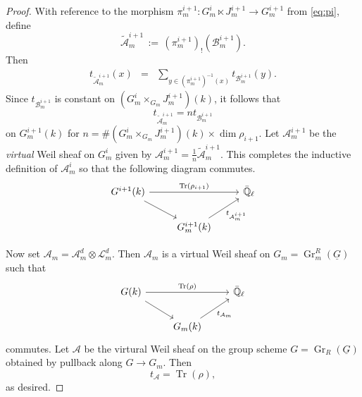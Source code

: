 \documentclass[10pt]{amsart}
\theoremstyle{plain}
\theoremstyle{definition}
\newcommand{\EE}{\mathbb{\bar Q}_\ell}
\newcommand{\Fq}{k}
\DeclareMathOperator{\Gr}{Gr}
\DeclareMathOperator{\trace}{Tr}
\newcommand{\ceq}{{\, :=\, }}
\newcommand{\trFrob}[1]{t_{#1}}
\newcommand{\cs}[1]{{\mathcal{#1}}}
\begin{document}
\begin{proof}
With reference to the morphism $\pi_m^{i+1} : G_m^i \ltimes J_m^{i+1} \to G_m^{i+1}$ from \eqref{eq:pi}, define 
\[
\cs{\tilde A}_m^{i+1} \ceq (\pi_m^{i+1})_! (\cs{B}_m^{i+1}).
\]
Then
\begin{eqnarray*}
\trFrob{\cs{\tilde A}^{i+1}_m}(x)
&=& \sum_{y\in (\pi_m^{i+1})^{-1}(x)}  \trFrob{\cs{B}_m^{i+1}}(y).
\end{eqnarray*}
Since $\trFrob{\cs{B}^{i+1}_m}$ is constant on $(G_m^{i}\times_{G_m} J_m^{i+1})(\Fq)$, it follows that 
\[
\trFrob{\cs{\tilde A}^{i+1}_m} = n \trFrob{\cs{B}^{i+1}_m}
\]
on $G_m^{i+1}(\Fq)$ for $n = \# (G_m^{i}\times_{G_m} J_m^{i+1})(\Fq) \times \dim \rho_{i+1} $.
Let $\cs{A}_m^{i+1}$ be the \emph{virtual} Weil sheaf on $G_m^i$ given by $\cs{A}_m^{i+1} = \frac{1}{n} \cs{\tilde A}_m^{i+1}$. 
%
This completes the inductive definition of $\cs{A}_m^i$ so that the following diagram commutes.
\[
\begin{tikzcd}
G^{i+1}(\Fq) \arrow{rr}{\trace(\rho_{i+1})} \arrow{rd} && \EE\\
& G_m^{i+1}(\Fq)\arrow{ru}[swap]{{\trFrob{\cs{A}_m^{i+1}}} } & 
\end{tikzcd}
\]

Now set $\cs{A}_m = \cs{A}_m^{d} \otimes \cs{L}_m^d$.
Then $\cs{A}_m$ is a virtual Weil sheaf on $G_m = \Gr^{R}_m(\underline{G})$ such that
\[
\begin{tikzcd}
G(\Fq) \arrow{rr}{\trace(\rho)} \arrow{rd} && \EE\\
& G_m(\Fq) \arrow{ru}[swap]{\trFrob{\cs{A}_m}} & 
\end{tikzcd}
\]
commutes.
Let $\cs{A}$ be the virtural Weil sheaf on the group scheme $G= \Gr_{R}(\underline{G})$ obtained by pullback along $G \to G_m$.
Then 
\[
\trFrob{\cs{A}} = \trace(\rho),
\] 
as desired.
\end{proof}


\iffalse
\end{document}
